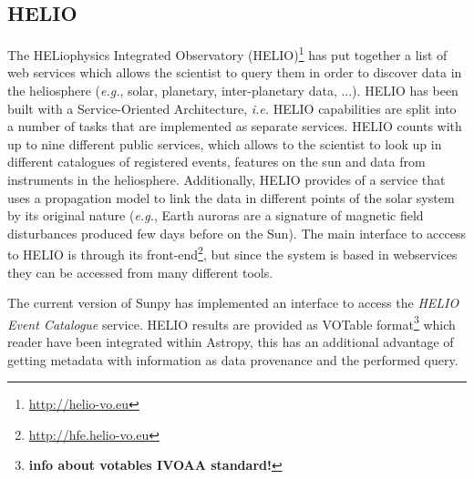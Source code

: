 \subsection{HELIO}\label{ssec:helio}

The HELiophysics Integrated Observatory 
(HELIO)\footnote{\url{http://helio-vo.eu}} has put together a list of web 
services which allows the scientist to query them in order to discover data in 
the heliosphere (\textit{e.g.}, solar, planetary, inter-planetary data, 
...)\cite{dps2012}. 
HELIO has been built with a Service-Oriented Architecture, 
\textit{i.e.} HELIO capabilities are split into a number of tasks that are 
implemented as separate services. 
HELIO counts with up to nine different public services, which allows to the scientist to look up in different catalogues of registered events, features on the sun and data from instruments in the heliosphere. 
Additionally, HELIO provides of a service that uses a propagation model to link the data in different points of the solar system by its original nature 
(\textit{e.g.}, Earth auroras are a signature of magnetic field disturbances 
produced few days before on the Sun).
The main interface to acccess to HELIO is through its front-end\footnote{
\url{http://hfe.helio-vo.eu}},
but since the system is based in webservices they can be accessed from many different tools.

The current version of Sunpy has implemented an interface to access the \textit{HELIO Event Catalogue} service.  
HELIO results are provided as VOTable format\footnote{\bf{info about votables IVOAA standard!}} 
which reader have been integrated within Astropy, this has an additional advantage of getting metadata with information as data provenance and the performed query.


